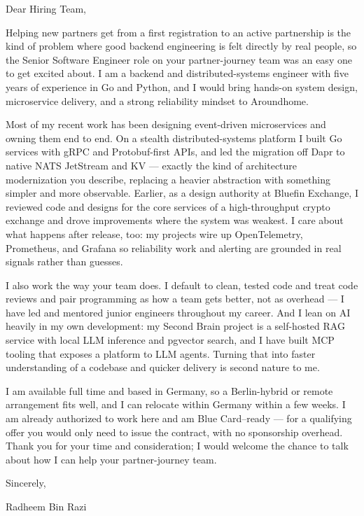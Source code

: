\documentclass[11pt,a4paper]{coverletter}
\begin{document}

\opening{Dear Hiring Team,}

Helping new partners get from a first registration to an active partnership is the kind of problem where good backend engineering is felt directly by real people, so the Senior Software Engineer role on your partner-journey team was an easy one to get excited about. I am a backend and distributed-systems engineer with five years of experience in Go and Python, and I would bring hands-on system design, microservice delivery, and a strong reliability mindset to Aroundhome.

Most of my recent work has been designing event-driven microservices and owning them end to end. On a stealth distributed-systems platform I built Go services with gRPC and Protobuf-first APIs, and led the migration off Dapr to native NATS JetStream and KV — exactly the kind of architecture modernization you describe, replacing a heavier abstraction with something simpler and more observable. Earlier, as a design authority at Bluefin Exchange, I reviewed code and designs for the core services of a high-throughput crypto exchange and drove improvements where the system was weakest. I care about what happens after release, too: my projects wire up OpenTelemetry, Prometheus, and Grafana so reliability work and alerting are grounded in real signals rather than guesses.

I also work the way your team does. I default to clean, tested code and treat code reviews and pair programming as how a team gets better, not as overhead — I have led and mentored junior engineers throughout my career. And I lean on AI heavily in my own development: my Second Brain project is a self-hosted RAG service with local LLM inference and pgvector search, and I have built MCP tooling that exposes a platform to LLM agents. Turning that into faster understanding of a codebase and quicker delivery is second nature to me.

I am available full time and based in Germany, so a Berlin-hybrid or remote arrangement fits well, and I can relocate within Germany within a few weeks. I am already authorized to work here and am Blue Card–ready — for a qualifying offer you would only need to issue the contract, with no sponsorship overhead. Thank you for your time and consideration; I would welcome the chance to talk about how I can help your partner-journey team.

\closing{Sincerely,}{Radheem Bin Razi}
\end{document}
